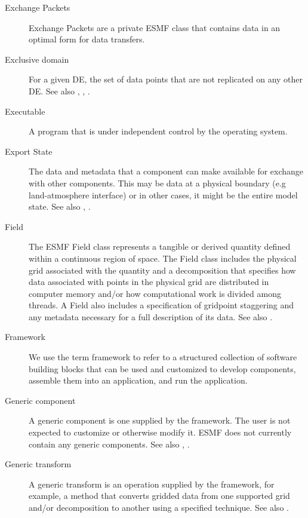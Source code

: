 \begin{description}
\label{glos:EP}
\item[Exchange Packets] Exchange Packets are a private
  ESMF class that contains data in an optimal form for data transfers.

\label{glos:ExcDomain}
\item[Exclusive domain] For a given DE, the 
  set of data points that are not replicated on any other DE.  See also 
  ,
  , .

\label{glos:Exec} 
\item[Executable] 
  A program that is under independent control by the operating 
  system.

\label{glos:ExportState} 
\item[Export State] 
  The data and metadata that 
  a component can make available for exchange with other components. 
  This may be data at a physical boundary (e.g land-atmosphere interface) 
  or in other cases, it might be the entire model state.  
  See also , .

\label{glos:Field} 
\item[Field] The ESMF Field class represents a tangible or derived quantity
defined within a continuous region of space.  The Field class includes
the physical grid associated with the quantity and a decomposition
that specifies how data associated with points in the 
physical grid are distributed in computer memory and/or how computational 
work is divided among threads.  A Field also includes a specification 
of gridpoint staggering and any metadata necessary for a full description
of its data.  See also .

\label{glos:Framework} 
\item[Framework] We use the term framework to 
  refer to a structured collection of software building blocks that can be used 
  and customized to develop components, assemble them into an application, and 
  run the application.

\label{glos:GenericComp} 
\item[Generic component] A generic component
  is one supplied by the framework.  The user is not expected to 
  customize or otherwise modify it.  ESMF does not currently contain any
  generic components.  See also , 
  . 

\label{glos:GenericTrans} 
\item[Generic transform] A generic transform 
  is an operation supplied by the framework, for example, a method 
  that converts gridded data from one supported grid and/or 
  decomposition to another using a specified technique.  See also .


\end{description}

